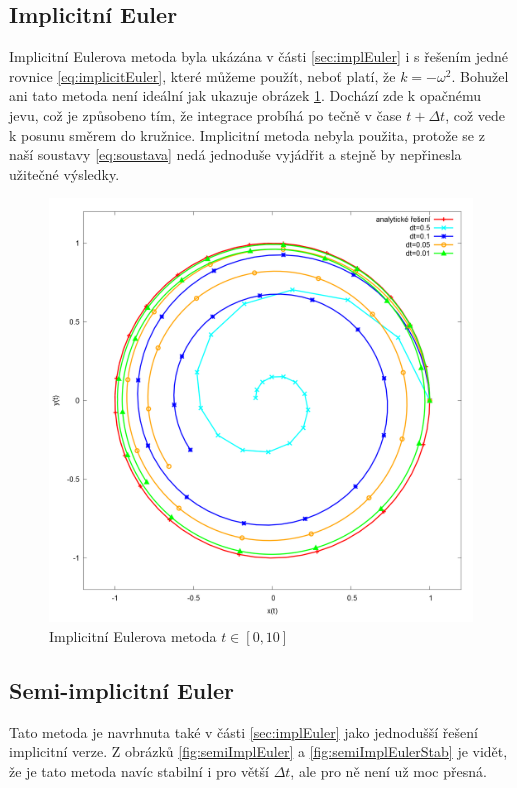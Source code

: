 \subsection{Implicitní Euler}
Implicitní Eulerova metoda byla ukázána v části \ref{sec:implEuler} i s řešením jedné rovnice \eqref{eq:implicitEuler}, které můžeme použít, neboť platí, že $ k=-\omega^2 $. 
Bohužel ani tato metoda není ideální jak ukazuje obrázek \ref{fig:implicitEuler}. Dochází zde k opačnému jevu, což je způsobeno tím, že integrace probíhá po tečně v čase $ t+\Delta t $, což vede k posunu směrem do kružnice. Implicitní metoda nebyla použita, protože se z naší soustavy \eqref{eq:soustava} nedá jednoduše vyjádřit a stejně by nepřinesla užitečné výsledky.
\begin{figure}
	\caption{Implicitní Eulerova metoda $ t\in [0,10] $}
	\label{fig:implicitEuler} 
	\centering
	\includegraphics[width=\linewidth]{Figs/implicitEuler}
\end{figure}
\subsection{Semi-implicitní Euler}
Tato metoda je navrhnuta také v části \ref{sec:implEuler} jako jednodušší řešení implicitní verze. Z obrázků \ref{fig:semiImplEuler} a \ref{fig:semiImplEulerStab} je vidět, že je tato metoda navíc stabilní i pro větší $ \Delta t $, ale pro ně není už moc přesná.

